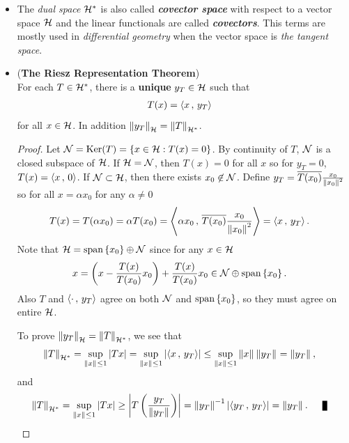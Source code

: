 \documentclass[11pt]{article}
\begin{document}
\begin{itemize}
\item \begin{remark}
The \emph{dual space} ${\mathcal H}^{*}$ is also called \emph{\textbf{covector space}} with respect to a vector space ${\mathcal H}$ and the linear functionals are called \emph{\textbf{covectors}}. This terms are mostly used in \emph{differential geometry} when the vector space is \emph{the tangent space}.
\end{remark}

\item \begin{theorem} (\textbf{The Riesz Representation Theorem}) \citep{reed1980methods, kreyszig1989introductory, conway2019course} \\
For each $T \in {\mathcal H}^{*}$, there is a \textbf{unique} $y_{T} \in {\mathcal H}$ such that 
\begin{align*}
T(x) &= \left\langle x\,,\, y_T \right\rangle
\end{align*} for all $x \in {\mathcal H}$. In addition $\left\|y_{T}\right\|_{{\mathcal H}} = \left\|T\right\|_{{\mathcal H}^{*}}$.
\end{theorem}
\begin{proof}
Let ${\mathcal N} = \text{Ker}(T) = \left\{x \in {\mathcal H}: T(x) = 0\right\}$. By continuity of $T$, ${\mathcal N}$ is a closed subspace of ${\mathcal H}$. If ${\mathcal H} = {\mathcal N}$, then $T(x) = 0$ for all $x$ so for $y_T =0$, $T(x) = \left\langle x\,,\, 0 \right\rangle$. If ${\mathcal N} \subset {\mathcal H}$, then there exists $x_0 \not\in {\mathcal N}$. Define $y_T = \overline{T(x_0)}\frac{x_0}{\left\|x_0\right\|_{}^2}$ so for all $x = \alpha x_0$ for any $\alpha \neq 0$
\begin{align*}
T(x) = T(\alpha x_0) = \alpha T(x_0) &= \left\langle \alpha x_0\,,\, \overline{T(x_0)}\frac{x_0}{\left\|x_0\right\|_{}^2} \right\rangle = \left\langle x\,,\, y_T \right\rangle.
\end{align*} Note that ${\mathcal H} = \text{span}\left\{x_0\right\}\oplus {\mathcal N}$ since for any $x \in {\mathcal H}$
\begin{align*}
x &= \left(x - \frac{T(x)}{T(x_0)}x_0\right) +\frac{T(x)}{T(x_0)}x_0 \in {\mathcal N} \oplus  \text{span}\left\{x_0\right\}.
\end{align*} Also $T$ and $\left\langle \cdot\,,\, y_T \right\rangle$ agree on both ${\mathcal N}$ and $\text{span}\left\{x_0\right\}$, so they must agree on entire ${\mathcal H}$.

To prove $\left\|y_{T}\right\|_{{\mathcal H}} = \left\|T\right\|_{{\mathcal H}^{*}}$, we see that 
\begin{align*}
\left\|T\right\|_{{\mathcal H}^{*}} &= \sup_{\left\|x\right\|_{} \le 1}\left\lvert Tx \right\rvert =  \sup_{\left\|x\right\|_{} \le 1}\left\lvert \left\langle x\,,\, y_T \right\rangle \right\rvert \le \sup_{\left\|x\right\|_{} \le 1}\left\|x\right\|_{}\left\|y_T\right\|_{}  = \left\|y_T\right\|_{},
\end{align*} and
\begin{align*}
\norm{T}{\cH^{*}} &= \sup_{\norm{x}{} \le 1}\abs{Tx} \ge \abs{T\paren{\frac{y_T}{\norm{y_T}{}}}} = \norm{y_T}{}^{-1} \abs{\inn{y_T}{y_T}} = \norm{y_T}{}. \qed
\end{align*}
\end{proof}


\end{itemize}
\end{document}
